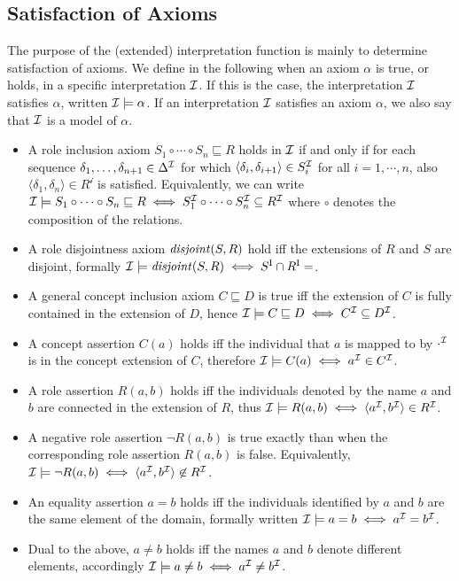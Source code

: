\begin{example}
\end{example}

\subsection{Satisfaction of Axioms} \label{satisfaction-of-axioms}

The purpose of the (extended) interpretation function is mainly to determine satisfaction of axioms. We define in the following when an axiom $\alpha$ is true, or holds, in a specific interpretation $\mathcal{I}$. If this is the case, the interpretation $\mathcal{I}$ satisfies $\alpha$, written $\mathcal{I} \models \alpha$. If an interpretation $\mathcal{I}$ satisfies an axiom $\alpha$, we also say that $\mathcal{I}$ is a model of $\alpha$.
\begin{itemize}
  \item A role inclusion axiom $S_1 \circ \cdots \circ S_n \sqsubseteq R$ holds in $\mathcal{I}$ if and only if for each sequence $\delta_1, \dots, \delta_{n + 1} \in \Delta^\mathcal{I}$ for which $\langle \delta_i , \delta_{i + 1} \rangle \in S_i^\mathcal{I}$ for all $i = 1, \cdots, n$, also $\langle \delta_1 , \delta_n \rangle \in R^\mathcal{i}$ is satisfied. Equivalently, we can write $\mathcal{I} \models S_1 \circ \cdots \circ S_n \sqsubseteq R \iff S_1^\mathcal{I} \circ \cdots \circ S_n^\mathcal{I} \subseteq R^\mathcal{I}$ where $\circ$ denotes the composition of the relations.
  \item A role disjointness axiom $\mathit{disjoint}(S, R)$ hold iff the extensions of $R$ and $S$ are disjoint, formally $\Imc \models \disjoint(S, R) \iff S^\mathrm{I} \cap R^\mathrm{I} = \empty$.
  \item A general concept inclusion axiom $C \sqsubseteq D$ is true iff the extension of $C$ is fully contained in the extension of $D$, hence $\mathcal{I} \models C \sqsubseteq D \iff C^\mathcal{I} \subseteq D^\mathcal{I}$.
  \item A concept assertion $C(a)$ holds iff the individual that $a$ is mapped to by $\cdot^\mathcal{I}$ is in the concept extension of $C$, therefore $\mathcal{I} \models C (a) \iff a^\mathcal{I} \in C^\mathcal{I}$.
  \item A role assertion $R(a, b)$ holds iff the individuals denoted by the name $a$ and $b$ are connected in the extension of $R$, thus $\mathcal{I} \models R(a, b) \iff \langle a^\mathcal{I}, b^\mathcal{I} \rangle \in R^\mathcal{I}$.
  \item A negative role assertion $\lnot R(a, b)$ is true exactly than when the corresponding role assertion $R(a, b)$ is false. Equivalently, $\mathcal{I} \models \lnot R(a, b) \iff \langle a^\mathcal{I}, b^\mathcal{I} \rangle \not\in R^\mathcal{I}$.
  \item An equality assertion $a = b$ holds iff the individuals identified by $a$ and $b$ are the same element of the domain, formally written $\mathcal{I} \models a = b \iff a^\mathcal{I} = b^\mathcal{I}$.
  \item Dual to the above, $a \not = b$ holds iff the names $a$ and $b$ denote different elements, accordingly $\mathcal{I} \models a \not= b \iff a^\mathcal{I} \not= b^\mathcal{I}$.
\end{itemize}
